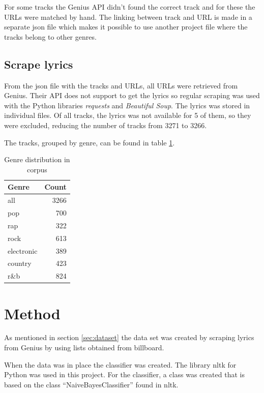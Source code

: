 \documentclass[a4paper, 12pt]{article}
\begin{document}
For some tracks the Genius API didn't found the correct track and for these the URLs were matched by hand.
The linking between track and URL is made in a separate json file which makes it possible to use another project file where the tracks belong to other genres.

\subsection{Scrape lyrics}
From the json file with the tracks and URLs, all URLs were retrieved from Genius.
Their API does not support to get the lyrics so regular scraping was used with the Python libraries \textit{requests} \cite{requests} and \textit{Beautiful Soup}.\cite{bs4}
The lyrics was stored in individual files.
Of all tracks, the lyrics was not available for 5 of them, so they were excluded, reducing the number of tracks from 3271 to 3266.

The tracks, grouped by genre, can be found in table \ref{tab:distribution}.
\begin{table}[h]
\begin{center}
    \begin{tabular}{| l | r |}
        \hline
        Genre & Count \\ \hline
        all & 3266 \\
        pop & 700 \\
        rap & 322 \\
        rock & 613 \\
        electronic & 389 \\
        country & 423 \\
        r\&b & 824 \\ \hline
    \end{tabular}
    \caption{Genre distribution in corpus}
    \label{tab:distribution}
\end{center}
\end{table}

\pagebreak
\section{Method}
As mentioned in section \ref{sec:dataset} the data set was created by scraping lyrics from Genius by using lists obtained from billboard.

When the data was in place the classifier was created.
The library nltk for Python was used in this project. \cite{nltk} \cite{bird2009natural}
For the classifier, a class was created that is based on the class ``NaiveBayesClassifier'' found in nltk.
\end{document}
